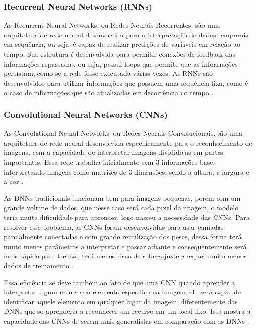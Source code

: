\subsubsection{Recurrent Neural Networks (RNNs)}
As Recurrent Neural Networks, ou Redes Neurais Recorrentes, são uma arquitetura de rede neural desenvolvida para a interpretação de dados temporais em sequência, ou seja, é capaz de realizar predições de variáveis em relação ao tempo. Sua estrutura é desenvolvida para permitir conexões de feedback das informações repassadas, ou seja, possui loops que permite que as informações persistam, como se a rede fosse executada várias vezes. As RNNs são desenvolvidos para utilizar informações que possuem uma sequência fixa, como é o caso de informações que são atualizadas em decorrência do tempo \cite{deepLearningTensorFlow}.

\subsubsection{Convolutional Neural Networks (CNNs)}
As Convolutional Neural Networks, ou Redes Neurais Convolucionais, são uma arquitetura de rede neural desenvolvida especificamente para o reconhecimento de imagens, com a capacidade de interpretar imagens dividido-as em partes importantes. Essa rede trabalha inicialmente com 3 informações base, interpretando imagens como matrizes de 3 dimensões, sendo a altura, a largura e a cor \cite{deepLearningTensorFlow}.

As DNNs tradicionais funcionam bem para imagens pequenas, porém com um grande volume de dados, que nesse caso será cada pixel da imagem, o modelo teria muita dificuldade para aprender, logo nasceu a necessidade das CNNs. Para resolver esse problema, as CNNs foram desenvolvidas para usar camadas parcialmente conectadas e com grande reutilização dos pesos, dessa forma terá muito menos parâmetros a interpretar e passar adiante e consequentemente será mais rápido para treinar, terá menos risco de sobre-ajuste e requer muito menos dados de treinamento \cite{deepLearningTensorFlow}.

Essa eficiência se deve também ao fato de que uma CNN quando aprender a interpretar algum recurso ou elemento específico na imagem, ela será capaz de identificar aquele elemento em qualquer lugar da imagem, diferentemente das DNNs que só aprenderia a reconhecer um recurso em um local fixo. Isso mostra a capacidade das CNNs de serem mais generalistas em comparação com as DNNs \cite{deepLearningTensorFlow}.

